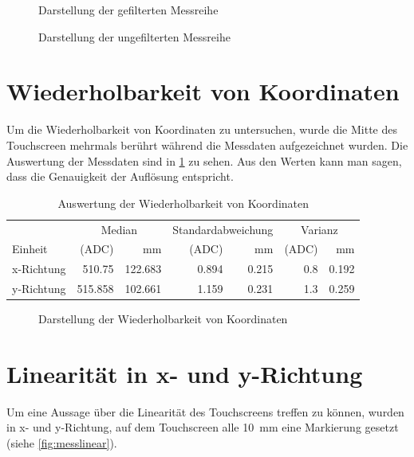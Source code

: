 \begin{figure}[ht!]
    \centering
    \caption{Darstellung der gefilterten Messreihe}
    \label{fig:filtered}
    \centering
    \caption{Darstellung der ungefilterten Messreihe}
    \label{fig:unfiltered}
\end{figure}

\newpage

\section{Wiederholbarkeit von Koordinaten}
\label{ab:wiederholung}
Um die Wiederholbarkeit von Koordinaten zu untersuchen, wurde die Mitte des Touchscreen mehrmals berührt während die Messdaten aufgezeichnet wurden.
Die Auswertung der Messdaten sind in \cref{tab:wiederholung} zu sehen.
Aus den Werten kann man sagen, dass die Genauigkeit der Auflösung entspricht.
\begin{table}[ht!]
    \caption{Auswertung der Wiederholbarkeit von Koordinaten}
    \begin{center}
        \begin{tabular}{@{}lrrrrrr@{} }
            \toprule&\multicolumn{2}{c}{Median}& \multicolumn{2}{c}{Standardabweichung}&\multicolumn{2}{c}{Varianz} \\ 
            Einheit    &(ADC)              &mm             &(ADC)          &mm             &(ADC)      &mm\\\midrule
         x-Richtung & \SI{510,75}{}    & \SI{122,683}{}&\SI{0,894}{}   &\SI{0,215}{}   &\SI{0,8}{}     & \SI{0,192}{} \\  
         y-Richtung & \SI{515,858}{}    & \SI{102,661}{}&\SI{1,159}{}   &\SI{0,231}{}   &\SI{1,3}{}     & \SI{0,259}{} \\ \bottomrule 
        \end{tabular}
        \label{tab:wiederholung}
    \end{center}   
\end{table}


\begin{figure}[ht!]
    \centering
    \caption{Darstellung der Wiederholbarkeit von Koordinaten}
    \label{fig:wiederholung}
\end{figure}

\section{Linearität in x- und y-Richtung}
\label{ab:linear}
Um eine Aussage über die Linearität des Touchscreens treffen zu können, wurden in x- und y-Richtung, auf dem Touchscreen alle \SI{10}{mm} eine Markierung gesetzt (siehe \cref{fig:messlinear}).


